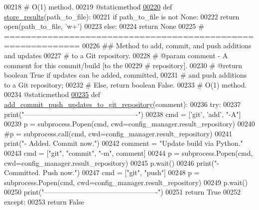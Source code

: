 \begin{DoxyCode}
00218     \textcolor{comment}{#   O(1) method.}
00219     @staticmethod
\hypertarget{miscellaneous_8py_source_l00220}{}\hyperlink{classutilities_1_1miscellaneous_1_1misc_ad364ae88435c58955e26fcc22b1cabb9}{00220}     \textcolor{keyword}{def }\hyperlink{classutilities_1_1miscellaneous_1_1misc_ad364ae88435c58955e26fcc22b1cabb9}{store\_results}(path\_to\_file):
00221         \textcolor{keywordflow}{if} path\_to\_file \textcolor{keywordflow}{is} \textcolor{keywordflow}{not} \textcolor{keywordtype}{None}:
00222             \textcolor{keywordflow}{return} open(path\_to\_file, \textcolor{stringliteral}{'w+'})
00223         \textcolor{keywordflow}{else}:
00224             \textcolor{keywordflow}{return} \textcolor{keywordtype}{None}
00225     \textcolor{comment}{# ============================================================}
00226     \textcolor{comment}{##  Method to add, commit, and push additions and updates}
00227     \textcolor{comment}{#       to a Git repository.}
00228     \textcolor{comment}{#   @param comment - A comment for this commit/build [to the}
00229     \textcolor{comment}{#                       repository].}
00230     \textcolor{comment}{#   @return boolean True if updates can be added, committed,}
00231     \textcolor{comment}{#       and push additions to a Git repository;}
00232     \textcolor{comment}{#       Else, return boolean False.}
00233     \textcolor{comment}{#   O(1) method.}
00234     @staticmethod
\hypertarget{miscellaneous_8py_source_l00235}{}\hyperlink{classutilities_1_1miscellaneous_1_1misc_a7837597eba06ec38b69b931ec18e39eb}{00235}     \textcolor{keyword}{def }\hyperlink{classutilities_1_1miscellaneous_1_1misc_a7837597eba06ec38b69b931ec18e39eb}{add\_commit\_push\_updates\_to\_git\_repository}(comment):
00236         \textcolor{keywordflow}{try}:
00237             print(\textcolor{stringliteral}{"-------------------------------------------------"})
00238             cmd = [\textcolor{stringliteral}{'git'}, \textcolor{stringliteral}{'add'}, \textcolor{stringliteral}{"-A"}]
00239             p = subprocess.Popen(cmd, cwd=config\_manager.result\_repository)
00240             \textcolor{comment}{#p = subprocess.call(cmd, cwd=config\_manager.result\_repository)}
00241             print(\textcolor{stringliteral}{"-    Added. Commit now."})
00242             comment = \textcolor{stringliteral}{"Update build via Python."}
00243             cmd = [\textcolor{stringliteral}{"git"}, \textcolor{stringliteral}{"commit"}, \textcolor{stringliteral}{"-m"}, comment]
00244             p = subprocess.Popen(cmd, cwd=config\_manager.result\_repository)
00245             p.wait()
00246             print(\textcolor{stringliteral}{"-    Committed. Push now."})
00247             cmd = [\textcolor{stringliteral}{"git"}, \textcolor{stringliteral}{"push"}]
00248             p = subprocess.Popen(cmd, cwd=config\_manager.result\_repository)
00249             p.wait()
00250             print(\textcolor{stringliteral}{"-------------------------------------------------"})
00251             \textcolor{keywordflow}{return} \textcolor{keyword}{True}
00252         \textcolor{keywordflow}{except}:
00253             \textcolor{keywordflow}{return} \textcolor{keyword}{False}
\end{DoxyCode}
